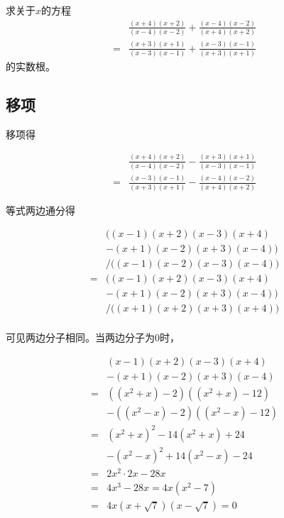 

求关于$x$的方程
\begin{align*}
  & \frac{(x + 4)(x + 2)}{(x - 4)(x - 2)} + \frac{(x - 4)(x - 2)}{(x + 4)(x + 2)} \\
  ={}& \frac{(x + 3)(x + 1)}{(x - 3)(x - 1)} + \frac{(x - 3)(x - 1)}{(x + 3)(x + 1)}
\end{align*}
的实数根。


\subsection{移项}

移项得

\begin{align*}
  & \frac{(x + 4)(x + 2)}{(x - 4)(x - 2)} - \frac{(x + 3)(x + 1)}{(x - 3)(x - 1)} \\
  ={}& \frac{(x - 3)(x - 1)}{(x + 3)(x + 1)} - \frac{(x - 4)(x - 2)}{(x + 4)(x + 2)}
\end{align*}

等式两边通分得

\begin{align*}
  & \Big((x - 1)(x + 2)(x - 3)(x + 4) \\
  &- (x + 1)(x - 2)(x + 3)(x - 4)\Big) \\
  &/ \Big((x - 1)(x - 2)(x - 3)(x - 4)\Big) \\
  ={}& \Big((x - 1)(x + 2)(x - 3)(x + 4) \\
  &- (x + 1)(x - 2)(x + 3)(x - 4)\Big) \\
  &/ \Big((x + 1)(x + 2)(x + 3)(x + 4)\Big) \\
\end{align*}

可见两边分子相同。当两边分子为0时，

\begin{align*}
  & (x - 1)(x + 2)(x - 3)(x + 4) \\
  &- (x + 1)(x - 2)(x + 3)(x - 4) \\
  ={}& ((x^2 + x) - 2)((x^2 + x) - 12) \\
  &- ((x^2 - x) - 2)((x^2 - x) - 12) \\
  ={}& (x^2 + x)^2 - 14(x^2 + x) + 24 \\
  &- (x^2 - x)^2 + 14(x^2 - x) - 24 \\
  ={}& 2x^2\cdot2x - 28x \\
  ={}& 4x^3 - 28x = 4x(x^2 - 7) \\
  ={}& 4x(x + \sqrt7)(x - \sqrt7) = 0 \\
\end{align*}

